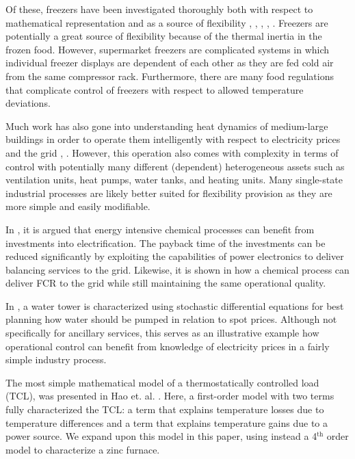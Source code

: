 \documentclass[lettersize,journal]{IEEEtran}
\begin{document}
Of these, freezers have been investigated thoroughly both with respect to mathematical representation \cite{pedersen2016improving}  and as a source of flexibility \cite{sossan2016grey}, \cite{o2013modelling}, \cite{de2019leveraging}, \cite{misaghian2022fast}, \cite{vrettos2016fast}. Freezers are potentially a great source of flexibility because of the thermal inertia in the frozen food. However, supermarket freezers are complicated systems in which individual freezer displays are dependent of each other as they are fed cold air from the same compressor rack. Furthermore, there are many food regulations that complicate control of freezers with respect to allowed temperature deviations.

Much work has also gone into understanding heat dynamics of medium-large buildings \cite{thilker2021non} in order to operate them intelligently with respect to electricity prices and the grid \cite{contreras2018tractable}, \cite{finck2018quantifying}. However, this operation also comes with complexity in terms of control with potentially many different (dependent) heterogeneous assets such as ventilation units, heat pumps, water tanks, and heating units. Many single-state industrial processes are likely better suited for flexibility provision as they are more simple and easily modifiable.

In \cite{mallapragada2023decarbonization}, it is argued that energy intensive chemical processes can benefit from investments into electrification. The payback time of the investments can be reduced significantly by exploiting the capabilities of power electronics to deliver balancing services to the grid. Likewise, it is shown in \cite{samani2022flexible} how a chemical process can deliver FCR to the grid while still maintaining the same operational quality.

In \cite{junker2020stochastic}, a water tower is characterized using stochastic differential equations for best planning how water should be pumped in relation to spot prices. Although not specifically for ancillary services, this serves as an illustrative example how operational control can benefit from knowledge of electricity prices in a fairly simple industry process.

The most simple mathematical model of a thermostatically controlled load (TCL), was presented in Hao et. al. \cite{hao2014aggregate}. Here, a first-order model with two terms fully characterized the TCL: a term that explains temperature losses due to temperature differences and a term that explains temperature gains due to a power source. We expand upon this model in this paper, using instead a 4$^{\text{th}}$ order model to characterize a zinc furnace.
\end{document}
